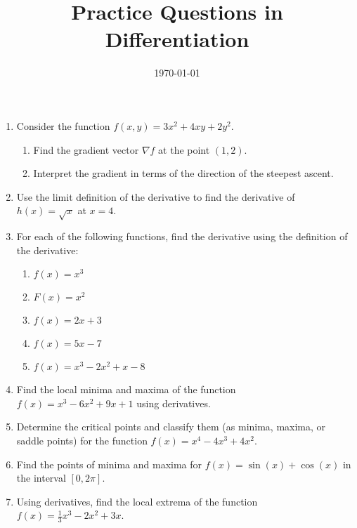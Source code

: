 \documentclass[12pt]{article}
\title{Practice Questions in Differentiation}
\author{}
\date{\today}
\begin{document}
\maketitle
\thispagestyle{fancy}

\begin{enumerate}[itemsep=20pt]

    \item Consider the function \( f(x, y) = 3x^2 + 4xy + 2y^2 \).
    \begin{enumerate}[label=(\alph*), itemsep=10pt]
        \item Find the gradient vector \( \nabla f \) at the point \( (1, 2) \).
        \item Interpret the gradient in terms of the direction of the steepest ascent.
    \end{enumerate}
    
    \item Use the limit definition of the derivative to find the derivative of \( h(x) = \sqrt{x} \) at \( x = 4 \).
    
    \item For each of the following functions, find the derivative using the definition of the derivative:
    \begin{enumerate}[label=(\alph*), itemsep=10pt]
        \item \( f(x) = x^3 \)
        \item \( F(x) = x^2 \)
        \item \( f(x) = 2x + 3 \)
        \item \( f(x) = 5x - 7 \)
        \item \( f(x) = x^3 - 2x^2 + x - 8 \)
    \end{enumerate}
    
    \item Find the local minima and maxima of the function \( f(x) = x^3 - 6x^2 + 9x + 1 \) using derivatives.
    
    \item Determine the critical points and classify them (as minima, maxima, or saddle points) for the function \( f(x) = x^4 - 4x^3 + 4x^2 \).
    
    \item Find the points of minima and maxima for \( f(x) = \sin(x) + \cos(x) \) in the interval \( [0, 2\pi] \).
    
    \item Using derivatives, find the local extrema of the function \( f(x) = \frac{1}{3}x^3 - 2x^2 + 3x \).
    

\end{enumerate}
\end{document}
